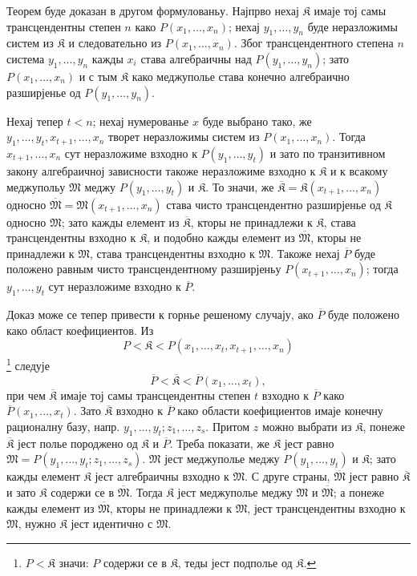﻿\documentclass[11pt]{article}
\begin{document}
Теорем буде доказан в другом формулованьу. Најпрво нехај $\mathfrak K$ имаје тој самы трансцендентны степен $n$ како $P(x_1,\ldots,x_n)$; нехај $y_1,\ldots,y_n$ буде неразложимы систем из $\mathfrak K$ и следовательно из $P(x_1,\ldots,x_n)$. Због трансцендентного степена $n$ система $y_1,\ldots,y_n$ кажды $x_i$ става алгебраичны над $P(y_1,\ldots,y_n)$; зато $P(x_1,\ldots,x_n)$ и с тым $\mathfrak K$ како меджуполье става конечно алгебраично разширјенье од $P(y_1,\ldots,y_n)$.

Нехај тепер $t<n$; нехај нумерованье $x$ буде выбрано тако, же $y_1,\ldots,y_t,x_{t+1},\ldots,x_n$ творет неразложимы систем из $P(x_1,\ldots,x_n)$. Тогда $x_{t+1},\ldots,x_n$ сут неразложиме взходно к $P(y_1,\ldots,y_t)$ и зато по транзитивном закону алгебраичној зависности такоже неразложиме взходно к $\mathfrak K$ и к всакому меджупольу $\mathfrak M$ меджу $P(y_1,\ldots,y_t)$ и $\mathfrak K$. То значи, же $\overline{\mathfrak K}=\mathfrak K(x_{t+1},\ldots,x_n)$ односно $\overline{\mathfrak M}=\mathfrak M(x_{t+1},\ldots,x_n)$ става чисто трансцендентно разширјенье од $\mathfrak K$ односно $\mathfrak M$; зато кажды елемент из $\overline{\mathfrak K}$, кторы не принадлежи к $\mathfrak K$, става трансцендентны взходно к $\mathfrak K$, и подобно кажды елемент из $\overline{\mathfrak M}$, кторы не принадлежи к $\mathfrak M$, става трансцендентны взходно к $\mathfrak M$. Такоже нехај $\overline P$ буде положено равным чисто трансцендентному разширјеньу $P(x_{t+1},\ldots,x_n)$; тогда $y_1,\ldots,y_t$ сут неразложиме взходно к $\overline P$.

Доказ може се тепер привести к горнье решеному случају, ако $\overline P$ буде положено како област коефициентов. Из
\[
P<\mathfrak K<P(x_1,\ldots,x_t,x_{t+1},\ldots,x_n)
\]
\footnote{$P<\mathfrak K$ значи: $P$ содержи се в $\mathfrak K$, теды јест подполье од $\mathfrak K$.} следује
\[
\overline P<\overline{\mathfrak K}<\overline P(x_1,\ldots,x_t),
\]
при чем $\overline{\mathfrak K}$ имаје тој самы трансцендентны степен $t$ взходно к $\overline P$ како $\overline P(x_1,\ldots,x_t)$. Зато $\overline{\mathfrak K}$ взходно к $\overline P$ како области коефициентов имаје конечну рационалну базу, напр. $y_1,\ldots,y_t; z_1,\ldots,z_s$. Притом $z$ можно выбрати из $\mathfrak K$, понеже $\overline{\mathfrak K}$ јест полье породжено од $\mathfrak K$ и $\overline P$. Треба показати, же $\mathfrak K$ јест равно $\mathfrak M=P(y_1,\ldots,y_t;z_1,\ldots,z_s)$. $\mathfrak M$ јест меджуполье меджу $P(y_1,\ldots,y_t)$ и $\mathfrak K$; зато кажды елемент $\mathfrak K$ јест алгебраичны взходно к $\mathfrak M$. С друге страны, $\overline{\mathfrak M}$ јест равно $\overline{\mathfrak K}$ и зато $\mathfrak K$ содержи се в $\overline{\mathfrak M}$. Тогда $\mathfrak K$ јест меджуполье меджу $\mathfrak M$ и $\overline{\mathfrak M}$; а понеже кажды елемент из $\overline{\mathfrak M}$, кторы не принадлежи к $\mathfrak M$, јест трансцендентны взходно к $\mathfrak M$, нужно $\mathfrak K$ јест идентично с $\mathfrak M$.
\end{document}
